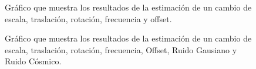 \begin{figure}[H]
\begin{center}
\hspace{0.5cm}

\end{center}

\caption{Gráfico que muestra los resultados de la estimación de un cambio de escala, traslación, rotación, frecuencia y offset.}
\end{figure}



\begin{figure}[H]
\begin{center}
\hspace{0.5cm}

\end{center}

\caption{Gráfico que muestra los resultados de la estimación de un cambio de escala, traslación, rotación, frecuencia, Offset, Ruido Gausiano y Ruido Cósmico.}
\end{figure}




